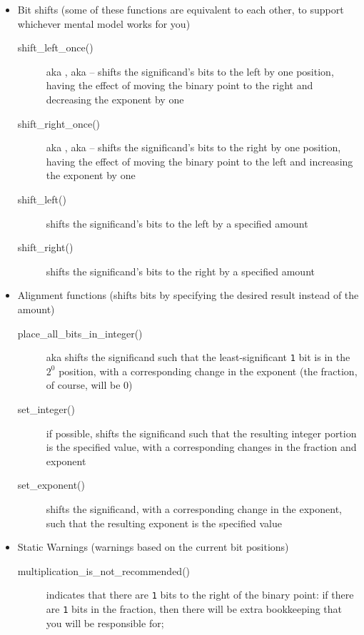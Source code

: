 \begin{itemize}
\begin{description}
    \end{description}
    \item Bit shifts (some of these functions are equivalent to each other, to support whichever mental model works for you)
    \begin{description}
        \item[shift\_left\_once()] aka , aka  -- shifts the significand's bits to the left by one position, having the effect of moving the binary point to the right and decreasing the exponent by one
        \item[shift\_right\_once()] aka , aka  -- shifts the significand's bits to the right by one position, having the effect of moving the binary point to the left and increasing the exponent by one
        \item[shift\_left()] shifts the significand's bits to the left by a specified amount
        \item[shift\_right()] shifts the significand's bits to the right by a specified amount
    \end{description}
    \item Alignment functions (shifts bits by specifying the desired result instead of the amount)
    \begin{description}
        \item[place\_all\_bits\_in\_integer()] aka  shifts the significand such that the least-significant \lstinline{1} bit is in the $2^0$ position, with a corresponding change in the exponent (the fraction, of course, will be 0)
        \item[set\_integer()] if possible, shifts the significand such that the resulting integer portion is the specified value, with a corresponding changes in the fraction and exponent
        \item[set\_exponent()] shifts the significand, with a corresponding change in the exponent, such that the resulting exponent is the specified value
    \end{description}
    \item Static Warnings (warnings based on the current bit positions)
    \begin{description}
        \item[multiplication\_is\_not\_recommended()] indicates that there are \lstinline{1} bits to the right of the binary point:
                if there are \lstinline{1} bits in the fraction, then there will be extra bookkeeping that you will be responsible for;

\end{description}
\end{itemize}
